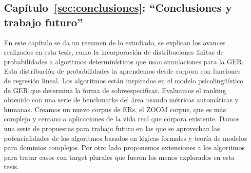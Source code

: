 \subsection{Cap\'itulo~\ref{sec:conclusiones}: ``Conclusiones y trabajo futuro''} En este cap\'itulo se da un resumen de lo estudiado, se explican los avances realizados en esta tesis, como la incorporaci\'on de distribuciones finitas de probabilidades a algoritmos determin\'isticos que usan simulaciones para la GER. Esta distribuci\'on de probabilidades la aprendemos desde corpora con funciones de regresi\'on lineal. Los algoritmos est\'an inspirados en el modelo psicoling\"u\'istico de GER que determina la forma de sobreespecificar. Evaluamos el ranking obtenido con una serie de benchmarks del \'area usando m\'etricas autom\'aticas y humanas. Creamos un nuevo corpus de ERs, el ZOOM corpus, que es m\'as complejo y cercano a aplicaciones de la vida real que corpora existente. Damos una serie de propuestas para trabajo futuro en las que se aprovechan las potencialidades de los algoritmos basados en l\'ogicas formales y teor\'ia de modelos para dominios complejos. Por otro lado proponemos extensiones a los algoritmos para tratar casos con target plurales que fueron los menos explorados en esta tesis.


